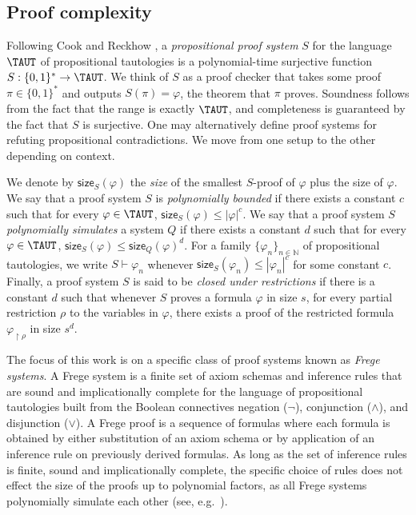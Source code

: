 \documentclass[11pt]{article}
\theoremstyle{definition}
\theoremstyle{plain}
\theoremstyle{remark}
\newcommand{\size}[2]{\mathsf{size}_{#1}(#2)}
\let\autocite\cite\let\textcite\citet
\begin{document}
\subsection{Proof complexity}
\label{subsec:proof-complexity}
Following Cook and Reckhow \cite{cookReckhow}, a \emph{propositional proof system} $S$ for the language $\TAUT$ of propositional tautologies is a polynomial-time surjective function $S : \{0,1\}^* \to \TAUT$. We think of $S$ as a proof checker that takes some proof $\pi\in \{0 ,1\}^*$ and outputs $S(\pi) = \varphi$, the theorem that $\pi$ proves. Soundness follows from the fact that the range is exactly $\TAUT$, and completeness is guaranteed by the fact that $S$ is surjective. One may alternatively define proof systems for refuting propositional contradictions. We move from one setup to the other depending on context.

We denote by $\size{S}{\varphi}$ the \emph{size} of the smallest $S$-proof of $\varphi$ plus the size of $\varphi$. We say that a proof system $S$ is \emph{polynomially bounded} if there exists a constant $c$ such that for every $\varphi \in \TAUT$, $\size{S}{\varphi} \leq |\varphi|^c$. We say that a proof system $S$ \emph{polynomially simulates} a system $Q$ if there exists a constant $d$ such that for every $\varphi \in \TAUT$, $\size{S}{\varphi} \leq \size{Q}{\varphi}^{d}$. For a family $\{ \varphi_n\}_{n\in\mathbb{N}}$ of propositional tautologies, we write $S \vdash \varphi_n$ whenever $\size{S}{\varphi_n} \leq |\varphi_n|^{c}$ for some constant $c$. Finally, a proof system $S$ is said to be \emph{closed under restrictions} if there is a constant $d$ such that whenever $S$ proves a formula $\varphi$ in size $s$, for every partial restriction $\rho$ to the variables in $\varphi$, there exists a proof of the restricted formula $\varphi_{\restriction\rho}$ in size $s^{d}$.

The focus of this work is on a specific class of proof systems known as  \emph{Frege systems}. A Frege system is a finite set of axiom schemas and inference rules that are sound and implicationally complete for the language of propositional tautologies built from the Boolean connectives negation ($\neg$), conjunction ($\land$), and disjunction ($\lor$). A Frege proof is a sequence of formulas where each formula is obtained by either substitution of an axiom schema or by application of an inference rule on previously derived formulas. As long as the set of inference rules is finite, sound and implicationally complete, the specific choice of rules does not effect the size of the proofs up to polynomial factors, as all Frege systems polynomially simulate each other (see, e.g.\ \autocite[Theorem 4.4.13]{krajicekBOOK}).
\end{document}
